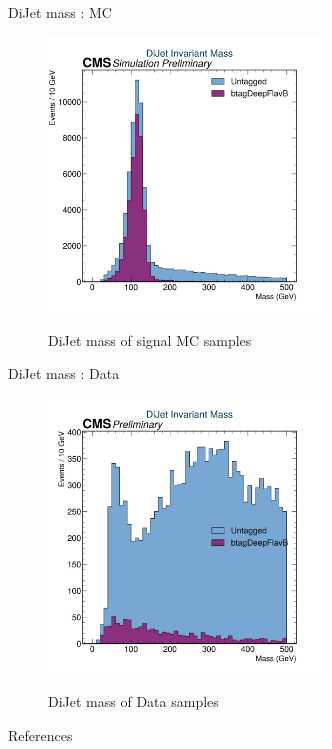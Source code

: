 \documentclass[10pt,xcolor=dvipsnames]{beamer}
\begin{document}
  \begin{frame}[fragile]{DiJet mass : MC }
    \begin{figure}
      \centering
      \includegraphics[width=0.65\textwidth]{../Kinematics/DiJetsMC.png}
      \label{DiJetMC}
      \caption{DiJet mass of signal MC samples}
    \end{figure}  
  \end{frame}

  \begin{frame}[fragile]{DiJet mass : Data }
    \begin{figure}
      \centering
      \includegraphics[width=0.65\textwidth]{../Kinematics/DiJetsData.png}
      \label{DiJetsData}
      \caption{DiJet mass of Data samples}
    \end{figure}  
  \end{frame}

\appendix



\begin{frame}[allowframebreaks]{References}

  
  

\end{frame}
\end{document}
